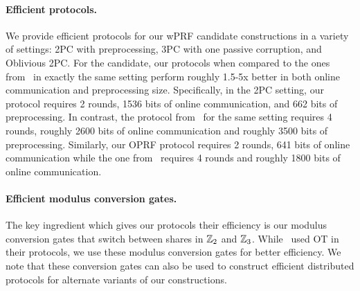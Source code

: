 \paragraph{Efficient protocols.} 
We provide efficient protocols for our wPRF candidate constructions in a variety of settings: 2PC with preprocessing, 3PC with one passive corruption, and Oblivious 2PC. For the \ttwPRF candidate, our protocols when compared to the ones from~\cite{boneh2018-darkmatter} in exactly the same setting perform roughly 1.5-5x better in both online communication and preprocessing size. Specifically, in the 2PC setting, our protocol requires 2 rounds, 1536 bits of online communication, and 662 bits of preprocessing. In contrast, the protocol from~\cite{boneh2018-darkmatter} for the same setting requires 4 rounds, roughly 2600 bits of online communication and roughly 3500 bits of preprocessing. Similarly, our OPRF protocol requires 2 rounds, 641 bits of online communication while the one from~\cite{boneh2018-darkmatter} requires 4 rounds and roughly 1800 bits of online communication.

\paragraph{Efficient modulus conversion gates.}
The key ingredient which gives our protocols their efficiency is our modulus conversion gates that switch between shares in $\mathbb{Z}_2$ and $\mathbb{Z}_3$. While~\cite{boneh2018-darkmatter} used OT in their protocols, we use these modulus conversion gates for better efficiency. We note that these conversion gates can also be used to construct efficient distributed protocols for alternate variants of our constructions.

 

